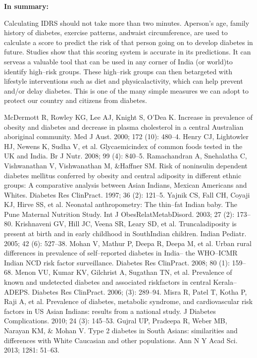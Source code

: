 \noindent\textbf{In summary:}

Calculating IDRS should not take more than two minutes. A\break person’s age, family history of diabetes, exercise patterns, and\break waist circumference, are used to calculate a score to predict the risk of that person going on to develop diabetes in future. Studies show that this scoring system is accurate in its predictions. It can serve\break as a valuable tool that can be used in any corner of India (or world)\break to identify high–risk groups. These high–risk groups can then be\break targeted with lifestyle interventions such as diet and physical\break activity, which can help prevent and/or delay diabetes. This is one of the many simple measures we can adopt to protect our country and citizens from diabetes.


\begin{thebibliography}{99}
 McDermott R, Rowley KG, Lee AJ, Knight S, O’Dea K. Increase in prevalence of obesity and diabetes and decrease in plasma chole\-sterol in a central Australian aboriginal community. Med J Aust. 2000; 172 (10): 480–4.
  Henry CJ, Lightowler HJ, Newens K, Sudha V, et al. Glycaemic\break index of common foods tested in the UK and India. Br J Nutr. 2008; 99 (4): 840–5.
  Ramachandran A, Snehalatha C, Vishwanathan V, Vishwanathan M, \&Haffner SM. Risk of noninsulin dependent diabetes mellitus conferred by obesity and central adiposity in different ethnic groups: A comparative analysis between Asian Indians, Mexican Americans and Whites. Diabetes Res ClinPract. 1997; 36 (2): 121–5.
  Yajnik CS, Fall CH, Coyaji KJ, Hirve SS, et al. Neonatal anthropo\-metry: The thin–fat Indian baby. The Pune Maternal Nutrition Study. Int J ObesRelatMetabDisord. 2003; 27 (2): 173–80.
  Krishnaveni GV, Hill JC, Veena SR, Leary SD, et al. Truncal\break adiposity is present at birth and in early childhood in South\break Indian children. Indian Pediatr. 2005; 42 (6): 527–38.
  Mohan V, Mathur P, Deepa R, Deepa M, et al. Urban rural diffe\-rences in prevalence of self–reported diabetes in India– the WHO–ICMR Indian NCD risk factor surveillance. Diabetes Res ClinPract. 2008; 80 (1): 159–68.
  Menon VU, Kumar KV, Gilchrist A, Sugathan TN, et al. Prevalence of known and undetected diabetes and associated risk\break factors in central Kerala–ADEPS. Diabetes Res ClinPract. 2006; (3): 289–94.
  Misra R, Patel T, Kotha P, Raji A, et al. Prevalence of diabetes, metabolic syndrome, and cardiovascular risk factors in US Asian Indians: results from a national study. J Diabetes Complications. 2010; 24 (3): 145–53.
  Gujral UP, Pradeepa R, Weber MB, Narayan KM, \& Mohan V. Type 2 diabetes in South Asians: similarities and differences with White Caucasian and other populations. Ann N Y Acad Sci. 2013; 1281: 51–63.
 \end{thebibliography}


